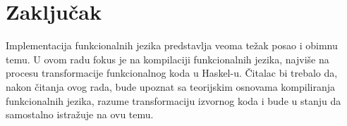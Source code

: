 \section{Zaključak}
\label{sec:zakljucak}

Implementacija funkcionalnih jezika predstavlja veoma težak posao i obimnu temu. U ovom radu fokus je na kompilaciji
funkcionalnih jezika, najviše na procesu transformacije funkcionalnog koda u Haskel-u. Čitalac bi trebalo da, nakon čitanja ovog rada, bude upoznat sa teorijskim osnovama kompiliranja funkcionalnih jezika, razume transformaciju izvornog koda i bude u stanju da samostalno istražuje na ovu temu.
